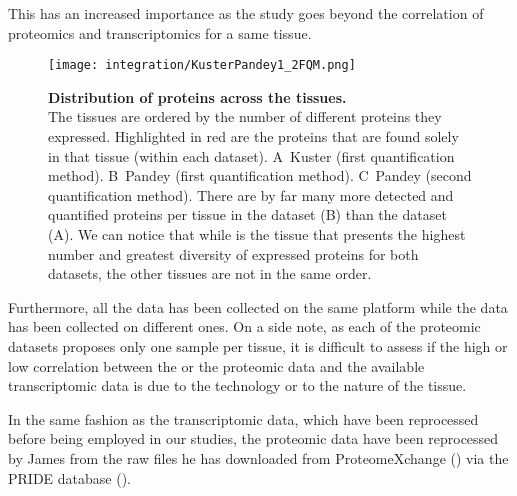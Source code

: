 This has an increased importance as the study goes beyond the correlation of
proteomics and transcriptomics for a same tissue.

\newcommand{\figKustPandFQM}{\textbf{Distribution of proteins across the
tissues.}\\The tissues are ordered by the number of different proteins they
expressed. Highlighted in red are the proteins that are found solely in that
tissue (within each dataset).
A\textbar\ Kuster (first quantification method).
B\textbar\ Pandey (first quantification method).
C\textbar\ Pandey (second quantification method).
There are by far many more detected and quantified proteins per tissue in the
\dataset{Pandey \etal} dataset (B\textbar) than the
\dataset{Kuster \etal} dataset (A\textbar). We can notice that while
\tissue{Testis} is the tissue that presents the highest number and greatest
diversity of expressed proteins for both datasets, the other tissues are not in
the same order.}


\begin{figure}[!htbp]
    \texttt{[image: integration/KusterPandey1\_2FQM.png]}\centering
    \caption[Distribution of proteins across the
    tissues]{\label{fig:KusterPandeyFQM}\figKustPandFQM}
\end{figure}

Furthermore, all the  data has been
collected on the same platform while the  data has been
collected on different ones. On a side note, as each of the proteomic datasets
proposes only one sample per tissue, it is difficult to assess if the high or low
correlation between the  or the 
proteomic data and the available transcriptomic data is due to the technology or
to the nature of the tissue.

In the same fashion as the transcriptomic data, which have been reprocessed
before being employed in our studies, the proteomic data have been reprocessed
by James from the raw files he has downloaded from ProteomeXchange
(\cite{ProteomeXchange:2014}) via the PRIDE database (\cite{Pride:2016}).

